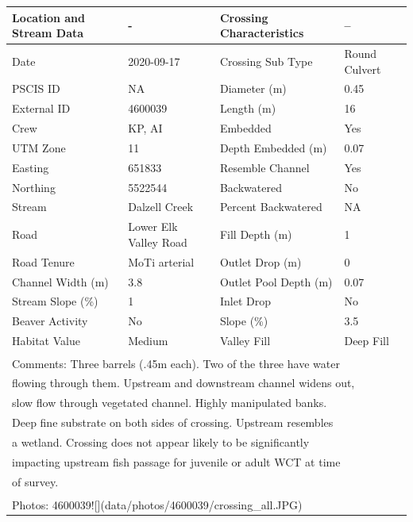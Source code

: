 \documentclass[
]{book}
\begin{document}
\begin{tabular}{llll}
\toprule
Location and Stream Data & - & Crossing Characteristics & --\\
\midrule
Date & 2020-09-17 & Crossing Sub Type & Round Culvert\\
PSCIS ID & NA & Diameter (m) & 0.45\\
External ID & 4600039 & Length (m) & 16\\
Crew & KP, AI & Embedded & Yes\\
UTM Zone & 11 & Depth Embedded (m) & 0.07\\
\addlinespace
Easting & 651833 & Resemble Channel & Yes\\
Northing & 5522544 & Backwatered & No\\
Stream & Dalzell Creek & Percent Backwatered & NA\\
Road & Lower Elk Valley Road & Fill Depth (m) & 1\\
Road Tenure & MoTi arterial & Outlet Drop (m) & 0\\
\addlinespace
Channel Width (m) & 3.8 & Outlet Pool Depth (m) & 0.07\\
Stream Slope (\%) & 1 & Inlet Drop & No\\
Beaver Activity & No & Slope (\%) & 3.5\\
Habitat Value & Medium & Valley Fill & Deep Fill\\
\bottomrule
\multicolumn{4}{l}{\textsuperscript{} Comments: Three barrels (.45m each). Two of the three have water}\\
\multicolumn{4}{l}{flowing through them. Upstream and downstream channel widens out,}\\
\multicolumn{4}{l}{slow flow through vegetated channel. Highly manipulated banks.}\\
\multicolumn{4}{l}{Deep fine substrate on both sides of crossing. Upstream resembles}\\
\multicolumn{4}{l}{a wetland. Crossing does not appear likely to be significantly}\\
\multicolumn{4}{l}{impacting upstream fish passage for juvenile or adult WCT at time}\\
\multicolumn{4}{l}{of survey.}\\
\multicolumn{4}{l}{\textsuperscript{} Photos: 4600039![](data/photos/4600039/crossing\_all.JPG)}\\
\end{tabular}
\end{document}
